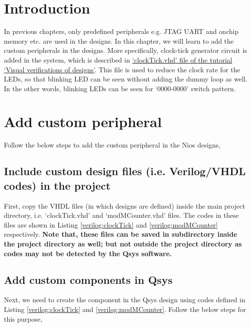 \section{Introduction}
In previous chapters, only predefined peripherals e.g. JTAG UART and onchip memory etc. are used in the designs. In this chapter, we will learn to add the custom peripherals in the designs. More specifically, clock-tick generator circuit is added in the system, which is described in \href{http://pythondsp.blogspot.com/2016/10/chapter-5-vhdl-visual-verifications.html#5.4-Clock-ticks}{`clockTick.vhd' file of the tutorial `Visual verifications of designs'}. This file is used to reduce the clock rate for the LEDs, so that blinking LED can be seen without adding the dummy loop as well. In the other words, blinking LEDs can be seen for `0000-0000' switch pattern. 

\section{Add custom peripheral}
Follow the below steps to add the custom peripheral in the Nios designs, 

\subsection{Include custom design files (i.e. Verilog/VHDL codes) in the project} 
First, copy the VHDL files (in which designs are defined) inside the main project directory,  i.e. `clockTick.vhd' and `modMCounter.vhd' files. The codes in these files are shown in Listing \ref{verilog:clockTick} and \ref{verilog:modMCounter} respectively. \textbf{Note that, these files can be saved in subdirectory inside the project directory as well; but not outside the project directory as codes may not be detected by the Qsys software.}





 
\subsection{Add custom components in Qsys}
Next, we need to create the component in the Qsys design using codes defined in Listing \ref{verilog:clockTick} and \ref{verilog:modMCounter}. Follow the below steps for this purpose, 

